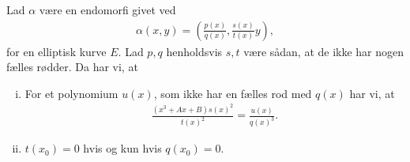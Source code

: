 \begin{lemma}
\label{rational_lemma}
Lad $\alpha$ være en endomorfi givet ved
\begin{align*}
	\alpha(x, y) = \left( \frac{p(x)}{q(x)}, \frac{s(x)}{t(x)}y \right),
\end{align*}
for en elliptisk kurve $E$. Lad $p, q$ henholdsvis $s, t$ være sådan, at de ikke har nogen fælles rødder. Da har vi, at
\begin{enumerate}[(i)]
	\item For et polynomium $u(x)$, som ikke har en fælles rod med $q(x)$ har vi, at
	\begin{align*}
		\frac{(x^3+Ax+B)s(x)^2}{t(x)^2} = \frac{u(x)}{q(x)^3}.
	\end{align*}
	\item $t(x_0)=0$ hvis og kun hvis $q(x_0)=0$.
\end{enumerate}
\end{lemma}
